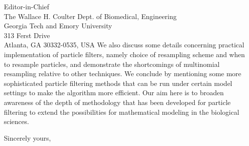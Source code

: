 \documentclass{letter} %
\begin{document}
\begin{letter}{Editor-in-Chief \\
The Wallace H. Coulter Dept. of Biomedical, Engineering \\
Georgia Tech and Emory University \\
313 Ferst Drive \\
Atlanta, GA 30332-0535, USA
}
We also discuss some details concerning practical implementation of particle filters, namely choice of resampling scheme and when to resample particles, and demonstrate the shortcomings of multinomial resampling relative to other techniques. We conclude by mentioning some more sophisticated particle filtering methods that can be run under certain model settings to make the algorithm more efficient. Our aim here is to broaden awareness of the depth of methodology that has been developed for particle filtering to extend the possibilities for mathematical modeling in the biological sciences.

\closing{Sincerely yours,}

\end{letter}
\end{document}

